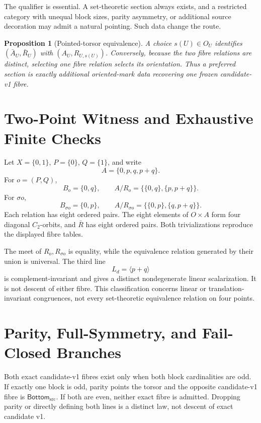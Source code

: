 \documentclass[11pt]{article}
\newtheorem{proposition}{Proposition}
\newcommand{\Bottom}{\mathsf{Bottom}_{\mathrm{src}}}
\begin{document}
The qualifier is essential. A set-theoretic section always exists, and a
restricted category with unequal block sizes, parity asymmetry, or additional
source decoration may admit a natural pointing. Such data change the route.

\begin{proposition}[Pointed-torsor equivalence]
A choice \(s(U)\in O_U\) identifies
\((\bar A_U,\bar R_U)\) with
\((A_U,R_{U,s(U)})\). Conversely, because the two fibre relations are
distinct, selecting one fibre relation selects its orientation. Thus a
preferred section is exactly additional oriented-mark data recovering one
frozen candidate-v1 fibre.
\end{proposition}

\section{Two-Point Witness and Exhaustive Finite Checks}

Let \(X=\{0,1\}\), \(P=\{0\}\), \(Q=\{1\}\), and write
\[
A=\{0,p,q,p+q\}.
\]
For \(o=(P,Q)\),
\[
B_o=\{0,q\},\qquad
A/R_o=\bigl\{\{0,q\},\{p,p+q\}\bigr\}.
\]
For \(\sigma o\),
\[
B_{\sigma o}=\{0,p\},\qquad
A/R_{\sigma o}=\bigl\{\{0,p\},\{q,p+q\}\bigr\}.
\]
Each relation has eight ordered pairs. The eight elements of \(O\times A\)
form four diagonal \(C_2\)-orbits, and \(\bar R\) has eight ordered pairs.
Both trivializations reproduce the displayed fibre tables.

The meet of \(R_o,R_{\sigma o}\) is equality, while the equivalence relation
generated by their union is universal. The third line
\[
L_d=\langle p+q\rangle
\]
is complement-invariant and gives a distinct nondegenerate linear
scalarization. It is not descent of either fibre. This classification concerns
linear or translation-invariant congruences, not every set-theoretic
equivalence relation on four points.

\section{Parity, Full-Symmetry, and Fail-Closed Branches}

Both exact candidate-v1 fibres exist only when both block cardinalities are
odd. If exactly one block is odd, parity points the torsor and the opposite
candidate-v1 fibre is \(\Bottom\). If both are even, neither exact fibre is
admitted. Dropping parity or directly defining both lines is a distinct law,
not descent of exact candidate v1.
\end{document}
